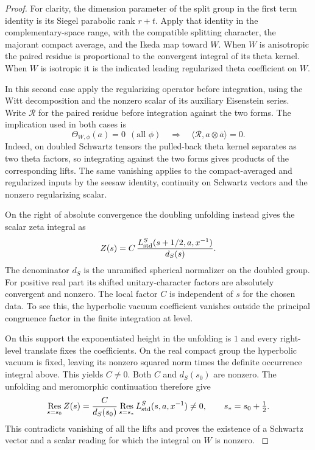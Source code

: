 \begin{proof}
For clarity, the dimension parameter of the split group in
the first term identity is its Siegel parabolic rank \(r+t\).
Apply that identity in the complementary-space range,
with the compatible splitting character, the majorant
compact average, and the Ikeda map toward \(W\).
When \(W\) is anisotropic the paired residue is proportional
to the convergent integral of its theta kernel. When \(W\)
is isotropic it is the indicated leading regularized theta
coefficient on \(W\).

In this second case apply the
regularizing operator before integration, using the Witt
decomposition and the nonzero scalar of its auxiliary
Eisenstein series. Write \(\mathcal R\) for the paired residue before integration against the two forms. The implication used in both cases is
\[
 \Theta_{W,\phi}(a)=0\ \ (\text{all }\phi)\quad\Longrightarrow\quad \langle\mathcal R,a\otimes\overline a\rangle=0.
\]
Indeed, on doubled
Schwartz tensors the pulled-back theta kernel separates as
two theta factors, so integrating against the two forms
gives products of the corresponding lifts. The same
vanishing applies to the compact-averaged and regularized
inputs by the seesaw identity, continuity on Schwartz
vectors and the nonzero regularizing scalar.
\cite{gqt-rallis,yamana-first-term}\label{cor:selected-point-adjoint-3}

On the right of absolute convergence the doubling
unfolding instead gives the scalar zeta integral as
\[
 Z(s)=C\,\frac{L_{\rm std}^S(s+1/2,a,x^{-1})}{d_S(s)}.
\]
The denominator \(d_S\) is the unramified spherical
normalizer on the doubled group. For positive real part its
shifted unitary-character factors are absolutely
convergent and nonzero. The local factor \(C\) is independent
of \(s\) for the chosen data. To see this, the hyperbolic
vacuum coefficient vanishes outside the principal
congruence factor in the finite integration at level.

On this support the exponentiated height in the unfolding
is \(1\) and every right-level translate fixes the
coefficients. On the real compact group the hyperbolic
vacuum is fixed, leaving its nonzero squared norm times the
definite occurrence integral above. This yields \(C\ne0\).
Both \(C\) and \(d_S(s_0)\) are nonzero. The unfolding and
meromorphic continuation therefore give
\[
      \operatorname*{Res}_{s=s_0} Z(s)
        =\frac{C}{d_S(s_0)}
                 \operatorname*{Res}_{s=s_*}L_{\rm std}^S(s,a,x^{-1})
        \ne0,\qquad s_*=s_0+\tfrac12 .
\] This contradicts
vanishing of all the lifts and proves the existence of a
Schwartz vector and a scalar reading for which the integral
on \(W\) is nonzero. \label{cor:selected-point-adjoint-4}


\end{proof}
